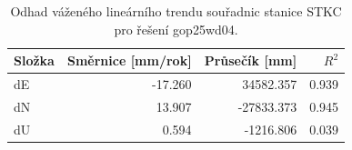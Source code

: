 \begin{table}[htbp]
\caption{Odhad váženého lineárního trendu souřadnic stanice STKC pro řešení gop25wd04.}
\label{tab:gop25wd04_stcd_stkc_weighted_1seg}
\begin{tabular}{lrrr}
\toprule
Složka & Směrnice [mm/rok] & Průsečík [mm] & $R^2$ \\
\midrule
dE & -17.260 & 34582.357 & 0.939 \\
dN & 13.907 & -27833.373 & 0.945 \\
dU & 0.594 & -1216.806 & 0.039 \\
\bottomrule
\end{tabular}
\end{table}
